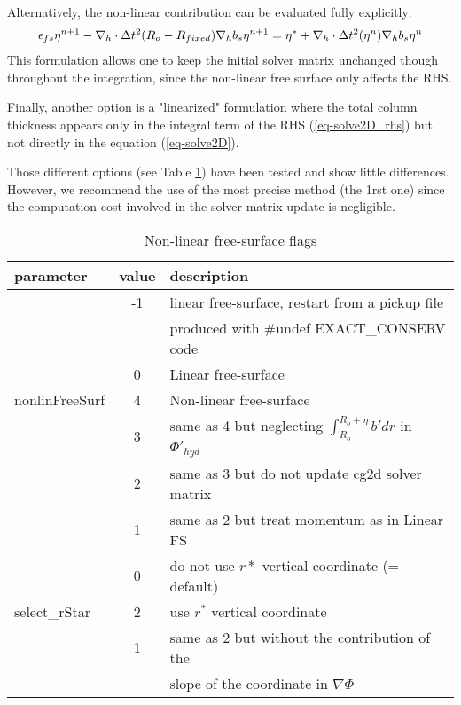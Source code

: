 Alternatively, the non-linear contribution can be evaluated fully
explicitly:
\begin{eqnarray*}
\epsilon_{fs} {\eta}^{n+1} -
{\bf \nabla}_h \cdot \Delta t^2 (R_o-R_{fixed})
{\bf \nabla}_h b_s {\eta}^{n+1}
= {\eta}^*
+{\bf \nabla}_h \cdot \Delta t^2 (\eta^{n})
{\bf \nabla}_h b_s {\eta}^{n}
\end{eqnarray*} 
This formulation allows one to keep the initial solver matrix
unchanged though throughout the integration, since the non-linear free
surface only affects the RHS.

Finally, another option is a "linearized" formulation where the total
column thickness appears only in the integral term of the RHS
(\ref{eq-solve2D_rhs}) but not directly in the equation
(\ref{eq-solve2D}).

Those different options (see Table \ref{tab:nonLinFreeSurf_flags})
have been tested and show little differences. However, we recommend
the use of the most precise method (the 1rst one) since the 
computation cost involved in the solver matrix update is negligible.

\begin{table}[htb]
\centering
 \begin{tabular}[htb]{|l|c|l|}
   \hline
   parameter & value & description \\ 
   \hline
                   & -1 & linear free-surface, restart from a pickup file \\
                   &    & produced with \#undef EXACT\_CONSERV code\\
   \cline{2-3}
                   & 0 & Linear free-surface \\ 
   \cline{2-3}
    nonlinFreeSurf & 4 & Non-linear free-surface \\
   \cline{2-3}
                   & 3 & same as 4 but neglecting
                           $\int_{R_o}^{R_o+\eta} b' dr $ in $\Phi'_{hyd}$ \\
   \cline{2-3}
                   & 2 & same as 3 but do not update cg2d solver matrix \\
   \cline{2-3}
                  & 1 & same as 2 but treat momentum as in Linear FS \\
   \hline
                  & 0 & do not use $r*$ vertical coordinate (= default)\\
   \cline{2-3}
    select\_rStar & 2 & use $r^*$ vertical coordinate \\
   \cline{2-3}
                  & 1 & same as 2 but without the contribution of the\\
                  &   & slope of the coordinate in $\nabla \Phi$ \\
   \hline
  \end{tabular}
  \caption{Non-linear free-surface flags}
  \label{tab:nonLinFreeSurf_flags}
\end{table}


